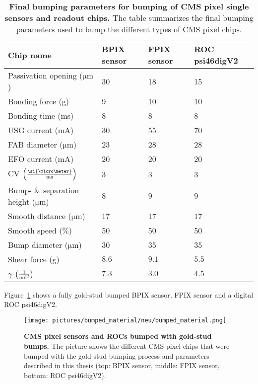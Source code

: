 \begin{table}
\caption[Final bumping parameters for bumping of \ac{CMS} pixel single sensors and readout chips]{\textbf{Final bumping parameters for bumping of \ac{CMS} pixel single sensors and readout chips.} The table summarizes the final bumping parameters used to bump the different types of \ac{CMS} pixel chips.}\label{tab:final_parameters}
\begin{center}
\begin{tabular}{llll}
\toprule
Chip name&\ac{BPIX} sensor&\ac{FPIX} sensor & \acs{ROC} psi46digV2\\
\midrule
Passivation opening ($\si{\micro \meter}$)&30&18&15\\
Bonding force (g)&9&10&10\\
Bonding time (ms)&8&8&8\\
\ac{USG} current (mA)&30&55&70\\
\ac{FAB} diameter ($\si{\micro \meter}$)&23&28&28\\
\ac{EFO} current (mA)&20&20&20\\
\acl{CV} $\left( \frac{\si{\micro \meter}}{\rm{ms}}\right)$&3&3&3\\
Bump- $\&$ separation height ($\si{\micro \meter}$)&8&9&9\\
Smooth distance ($\si{\micro \meter}$)&17&17&17\\
Smooth speed ($\%$)&50&50&50\\
Bump diameter ($\si{\micro \meter}$)&30&35&35\\
Shear force (g)&$8.6$&$9.1$&$5.5$\\
$\gamma$ $\left( \frac{1}{\rm{mil}^2}\right)$&$7.3$&$3.0$&$4.5$\\
\bottomrule
\end{tabular}
\end{center}
\end{table}
Figure~\ref{pic:bumped_material} shows a fully gold-stud bumped \ac{BPIX} sensor, \ac{FPIX} sensor and a digital \acs{ROC} psi46digV2.
\begin{figure}
\begin{center}
\texttt{[image: pictures/bumped\_material/neu/bumped\_material.png]}
\end{center}
\caption[\acs{CMS} pixel sensors and \acs{ROC}s bumped with gold-stud bumps]{\textbf{\acs{CMS} pixel sensors and \acs{ROC}s bumped with gold-stud bumps.} The picture shows the different \ac{CMS} pixel chips that were bumped with the gold-stud bumping process and parameters described in this thesis (top: \ac{BPIX} sensor, middle: \ac{FPIX} sensor, bottom: \acs{ROC} psi46digV2).}\label{pic:bumped_material}
\end{figure}


